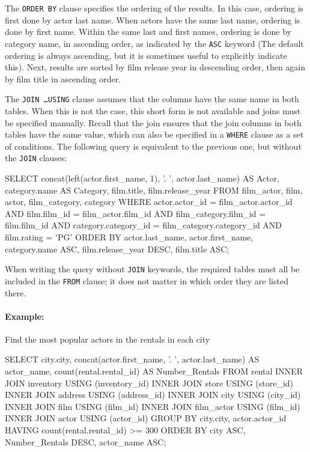 The \texttt{ORDER BY} clause specifies the ordering of the results. In this case, ordering is first done by actor last name. When actors have the same last name, ordering is done by first name. Within the same last and first names, ordering is done by category name, in ascending order, as indicated by the \texttt{ASC} keyword (The default ordering is always ascending, but it is sometimes useful to explicitly indicate this). Next, results are sorted by film release year in descending order, then again by film title in ascending order.

The \texttt{JOIN \ldots USING} clause assumes that the columns have the same name in both tables. When this is not the case, this short form is not available and joins must be specified manually. Recall that the join ensures that the join columns in both tables have the same value, which can also be specified in a \texttt{WHERE} clause as a set of conditions. The following query is equivalent to the previous one, but without the \texttt{JOIN} clauses:

\begin{samepage}
\begin{sqlcode}
SELECT concat(left(actor.first_name, 1), '. ', 
           actor.last_name) AS Actor, 
       category.name AS Category, 
       film.title, 
       film.release_year
  FROM film_actor, film, actor, film_category, category
  WHERE actor.actor_id = film_actor.actor_id AND
        film.film_id = film_actor.film_id AND
        film_category.film_id = film.film_id AND
        category.category_id = film_category.category_id AND
        film.rating = 'PG'
  ORDER BY actor.last_name, 
           actor.first_name, 
           category.name ASC, 
           film.release_year DESC, 
           film.title ASC;
\end{sqlcode}
\end{samepage}

When writing the query without \texttt{JOIN} keywords, the required tables must all be included in the \texttt{FROM} clause; it does not matter in which order they are listed there.

\paragraph{Example:} Find the most popular actors in the rentals in each city

\begin{samepage}
\begin{sqlcode}
SELECT city.city, 
       concat(actor.first_name, '. ', actor.last_name) AS actor_name,
       count(rental.rental_id) AS Number_Rentals
  FROM rental
  INNER JOIN inventory USING (inventory_id)
  INNER JOIN store USING (store_id)
  INNER JOIN address USING (address_id)
  INNER JOIN city USING (city_id)
  INNER JOIN film USING (film_id)
  INNER JOIN film_actor USING (film_id)
  INNER JOIN actor USING (actor_id)
  GROUP BY city.city, actor.actor_id
  HAVING count(rental.rental_id) >= 300
  ORDER BY city ASC, 
           Number_Rentals DESC, 
           actor_name ASC;
\end{sqlcode}
\end{samepage}

